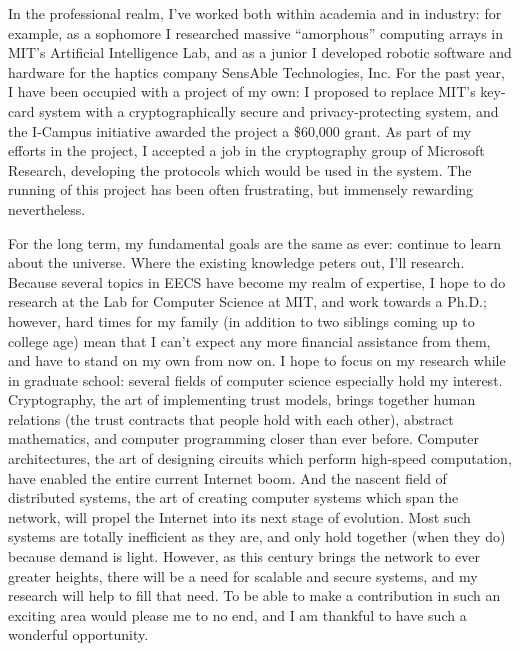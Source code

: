 \documentclass[11pt]{article}
\begin{document}
In the professional realm, I've worked both within academia and in
industry: for example, as a sophomore I researched massive
``amorphous'' computing arrays in MIT's Artificial Intelligence Lab,
and as a junior I developed robotic software and hardware for the
haptics company SensAble Technologies, Inc.  For the past year, I have
been occupied with a project of my own: I proposed to replace MIT's
key-card system with a cryptographically secure and privacy-protecting
system, and the I-Campus initiative awarded the project a \$60,000
grant.  As part of my efforts in the project, I accepted a job in the
cryptography group of Microsoft Research, developing the protocols
which would be used in the system.  The running of this project has
been often frustrating, but immensely rewarding nevertheless.

For the long term, my fundamental goals are the same as ever: continue
to learn about the universe.  Where the existing knowledge peters out,
I'll research.  Because several topics in EECS have become my realm of
expertise, I hope to do research at the Lab for Computer Science at
MIT, and work towards a Ph.D.; however, hard times for my family (in
addition to two siblings coming up to college age) mean that I can't
expect any more financial assistance from them, and have to stand on
my own from now on.  I hope to focus on my research while in graduate
school: several fields of computer science especially hold my
interest.  Cryptography, the art of implementing trust models, brings
together human relations (the trust contracts that people hold with
each other), abstract mathematics, and computer programming closer
than ever before.  Computer architectures, the art of designing
circuits which perform high-speed computation, have enabled the entire
current Internet boom.  And the nascent field of distributed systems,
the art of creating computer systems which span the network, will
propel the Internet into its next stage of evolution.  Most such
systems are totally inefficient as they are, and only hold together
(when they do) because demand is light.  However, as this century
brings the network to ever greater heights, there will be a need for
scalable and secure systems, and my research will help to fill that
need.  To be able to make a contribution in such an exciting area
would please me to no end, and I am thankful to have such a wonderful
opportunity.
\end{document}
